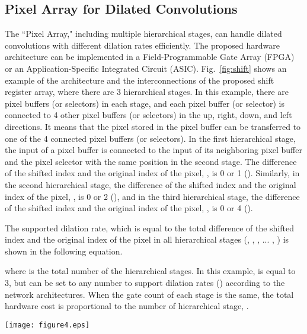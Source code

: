 \documentclass[10pt,twocolumn,letterpaper]{article}
\begin{document}
\subsection{Pixel Array for Dilated Convolutions}
\label{subsec:shift}

The ``Pixel Array," including multiple hierarchical stages, can handle dilated convolutions with different dilation rates efficiently. The proposed hardware architecture can be implemented in a Field-Programmable Gate Array (FPGA) or an Application-Specific Integrated Circuit (ASIC). Fig.~\ref{fig:shift} shows an example of the architecture and the interconnections of the proposed shift register array, where there are 3 hierarchical stages. In this example, there are  pixel buffers (or selectors) in each stage, and each pixel buffer (or selector) is connected to 4 other pixel buffers (or selectors) in the up, right, down, and left directions. It means that the pixel stored in the pixel buffer can be transferred to one of the 4 connected pixel buffers (or selectors). In the first hierarchical stage, the input of a pixel buffer is connected to the input of its neighboring pixel buffer and the pixel selector with the same position in the second stage. The difference of the shifted index and the original index of the pixel, , is 0 or 1 (). Similarly, in the second hierarchical stage, the difference of the shifted index and the original index of the pixel, , is 0 or 2 (), and in the third hierarchical stage, the difference of the shifted index and the original index of the pixel, , is 0 or 4 ().

The supported dilation rate, which is equal to the total difference of the shifted index and the original index of the pixel in all hierarchical stages (, , , ... , ) is shown in the following equation.

where  is the total number of the hierarchical stages. In this example,  is equal to 3, but  can be set to any number to support  dilation rates () according to the network architectures. When the gate count of each stage is the same, the total hardware cost is proportional to the number of hierarchical stage, .

\begin{figure*}[t]
\begin{center}
   \texttt{[image: figure4.eps]}\\
\end{center}
   \caption{An example of the hardware architecture and the interconnections of the ``Pixel Array" with  pixels.}
\label{fig:shift}
\end{figure*}
\end{document}
